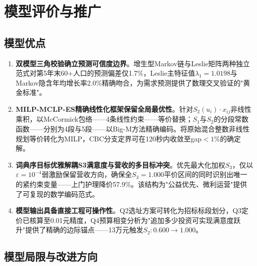 
\section{模型评价与推广}

\subsection{模型优点}

\begin{enumerate}[label=\textbf{优点\arabic*：}, leftmargin=*, itemsep=4pt]

    \item \textbf{双模型三角校验确立预测可信度边界}。增生型Markov链与Leslie矩阵两种独立范式对第5年末60+人口的预测偏差仅1.7\%，Leslie主特征值$\lambda_1=1.0198$与Markov隐含年均增长率2.0\%精确吻合，为需求预测提供了数理交叉验证的"黄金标准"。

    \item \textbf{MILP-MCLP-ES精确线性化框架保留全局最优性}。针对$S_2(u_i)\cdot x_{ij}$非线性乘积，以McCormick包络——4条线性约束——等价替换；$S_1$与$S_2$的分段常数函数——分别为4段与5段——以Big-M方法精确编码。将原始混合整数非线性规划等价转化为MILP，CBC分支定界可在120秒内收敛至gap$<1\%$的确定解。

    \item \textbf{词典序目标优雅解耦S3满意度与营收的多目标冲突}。优先最大化加权$S_3$，仅以$\varepsilon=10^{-4}$弱激励保留营收方向，确保全$S_3=1.000$平价区间的同时识别出唯一的紧约束变量——上门护理降价57.9\%。该结构为"公益优先、微利运营"提供了可复现的数学编码范式。

    \item \textbf{模型输出具备直接工程可操作性}。Q2选址方案可转化为招标标段划分，Q3定价已核算至0.01元精度，Q4预算相变分析为"追加多少投资可实现满意度跃升"提供了精确的边际锚点——13万元触发$S_2:0.600\to1.000$。

\end{enumerate}

\subsection{模型局限与改进方向}

